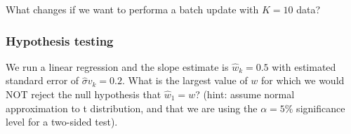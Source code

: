 
    What changes if we want to performa a batch update with $K=10$ data?


\subsubsection{Hypothesis testing}
    We run a linear regression and the slope estimate is $\hat{w}_k=0.5$ with estimated standard error of $\hat{\sigma}v_k=0.2$. What is the largest value of $w$ for which we would NOT reject the null hypothesis that $\hat{w}_1=w$? (hint: assume normal approximation to t distribution, and that we are using the $\alpha=5\%$ significance level for a two-sided test).

